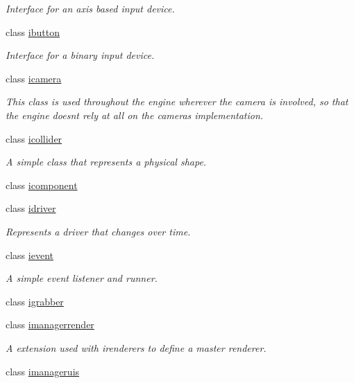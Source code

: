 \begin{DoxyCompactItemize}
\begin{DoxyCompactList}\small\item\em Interface for an axis based input device. \end{DoxyCompactList}\item 
class \hyperlink{classflounder_1_1ibutton}{ibutton}
\begin{DoxyCompactList}\small\item\em Interface for a binary input device. \end{DoxyCompactList}\item 
class \hyperlink{classflounder_1_1icamera}{icamera}
\begin{DoxyCompactList}\small\item\em This class is used throughout the engine wherever the camera is involved, so that the engine doesn\textquotesingle{}t rely at all on the camera\textquotesingle{}s implementation. \end{DoxyCompactList}\item 
class \hyperlink{classflounder_1_1icollider}{icollider}
\begin{DoxyCompactList}\small\item\em A simple class that represents a physical shape. \end{DoxyCompactList}\item 
class \hyperlink{classflounder_1_1icomponent}{icomponent}
\item 
class \hyperlink{classflounder_1_1idriver}{idriver}
\begin{DoxyCompactList}\small\item\em Represents a driver that changes over time. \end{DoxyCompactList}\item 
class \hyperlink{classflounder_1_1ievent}{ievent}
\begin{DoxyCompactList}\small\item\em A simple event listener and runner. \end{DoxyCompactList}\item 
class \hyperlink{classflounder_1_1igrabber}{igrabber}
\item 
class \hyperlink{classflounder_1_1imanagerrender}{imanagerrender}
\begin{DoxyCompactList}\small\item\em A extension used with irenderers to define a master renderer. \end{DoxyCompactList}\item 
class \hyperlink{classflounder_1_1imanageruis}{imanageruis}

\end{DoxyCompactItemize}
